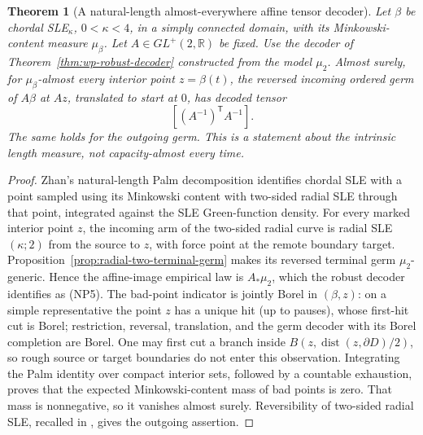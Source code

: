 \documentclass[11pt]{article}
\newtheorem{theorem}{Theorem}[section]
\theoremstyle{definition}\newtheorem{definition}[theorem]{Definition}
\theoremstyle{remark}\newtheorem{remark}[theorem]{Remark}
\begin{document}
\begin{theorem}[A natural-length almost-everywhere affine tensor decoder]
\label{thm:natural-point-tensor}
Let $\beta$ be chordal SLE$_\kappa$, $0<\kappa<4$, in a simply
connected domain, with its Minkowski-content measure $\mu_\beta$.
Let $A\in GL^+(2,\mathbb R)$ be fixed. Use the decoder of
Theorem~\ref{thm:wp-robust-decoder} constructed from the model $\mu_2$.
Almost surely, for $\mu_\beta$-almost every interior point
$z=\beta(t)$, the reversed incoming ordered germ of $A\beta$ at $Az$,
translated to start at $0$, has decoded tensor
\[
 [(A^{-1})^{\mathsf T}A^{-1}].
 \tag{NP5}
\]
The same holds for the outgoing germ. This is a statement about the
intrinsic length measure, not capacity-almost every time.
\end{theorem}
\begin{proof}
Zhan's natural-length Palm decomposition
\cite[Theorem 4.1 and Corollaries 4.2--4.3]{zhan-natural-palm}
identifies chordal SLE with a point sampled using its Minkowski content
with two-sided radial SLE through that point, integrated against the
SLE Green-function density. For every marked interior point $z$, the
incoming arm of the two-sided radial curve is radial SLE$(\kappa;2)$
from the source to $z$, with force point at the remote boundary target.
Proposition~\ref{prop:radial-two-terminal-germ} makes its reversed
terminal germ $\mu_2$-generic. Hence the affine-image empirical law
is $A_*\mu_2$, which the robust decoder identifies as (NP5).
The bad-point indicator is jointly Borel in $(\beta,z)$: on a
simple representative the point $z$ has a unique hit (up to pauses),
whose first-hit cut is Borel; restriction, reversal, translation, and
the germ decoder with its Borel completion are Borel. One may first
cut a branch inside $B(z,\operatorname{dist}(z,\partial D)/2)$,
so rough source or target boundaries do not enter this observation.
Integrating the Palm identity over compact interior sets, followed by
a countable exhaustion, proves that the expected Minkowski-content
mass of bad points is zero. That mass is nonnegative, so it vanishes
almost surely. Reversibility of two-sided radial SLE, recalled in
\cite[Section 2.2]{zhan-loops}, gives the outgoing assertion.
\end{proof}
\end{document}
